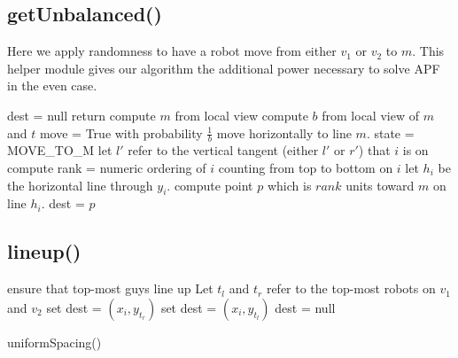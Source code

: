 \documentclass[preprint,10pt]{elsarticle}
\begin{document}
\subsection{getUnbalanced()} 
	Here we apply randomness to have a robot move from either $v_1$ or $v_2$ to $m$.
	This helper module gives our algorithm the additional power necessary to 
	solve APF in the even case.
\begin{algorithm}[H]
\begin{algorithmic}[1]
		\State dest = null
		\State return
	\EndIf
	\State compute $m$ from local view
	\State compute $b$ from local view of $m$ and $t$
	\State move = True with probability $\frac{1}{b}$ \Comment move horizontally to line $m$. 
		\State state = MOVE\_TO\_M
		\State let $l'$ refer to the vertical tangent (either $l'$ or $r'$) that $i$ is on
		\State compute rank = numeric ordering of $i$ counting from top to bottom on $i$
		\State let $h_i$ be the horizontal line through $y_i$. 
		\State compute point $p$ which is $rank$ units toward $m$ on line $h_i$.
		\State dest = $p$
	\EndIf

\EndProcedure
\end{algorithmic}
\end{algorithm}


\subsection{lineup()} 
	\begin{algorithm}[H]
	\begin{algorithmic}[1]
		
		\Comment ensure that top-most guys line up
		\State Let $t_l$ and $t_r$ refer to the top-most robots on $v_1$ and $v_2$
			\State set dest = $(x_i, y_{t_r})$
			\State set dest = $(x_i, y_{t_l})$
		\Else 
			\State dest = null
		\EndIf

		\State uniformSpacing()
	\EndProcedure
	\end{algorithmic}
	\end{algorithm}
\end{document}
